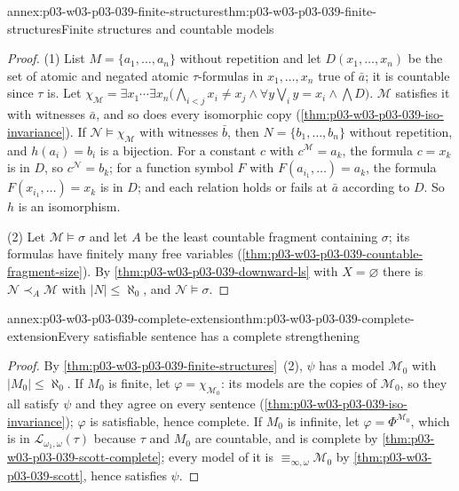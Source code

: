 \begin{annexitem}{annex:p03-w03-p03-039-finite-structures}{thm:p03-w03-p03-039-finite-structures}{Finite structures and countable models}
\begin{proof}
(1) List \(M=\{a_1,\dots,a_n\}\) without repetition and let \(D(x_1,\dots,x_n)\)
be the set of atomic and negated atomic \(\tau\)-formulas in
\(x_1,\dots,x_n\) true of \(\bar a\); it is countable since \(\tau\) is. Let
\(\chi_{\mathcal M}=\exists x_1\cdots\exists x_n\bigl(\bigwedge_{i<j}x_i\ne x_j\wedge\forall y\bigvee_iy=x_i\wedge\bigwedge D\bigr)\).
\(\mathcal M\) satisfies it with witnesses \(\bar a\), and so does every
isomorphic copy (\cref{thm:p03-w03-p03-039-iso-invariance}). If
\(\mathcal N\models\chi_{\mathcal M}\) with witnesses \(\bar b\), then
\(N=\{b_1,\dots,b_n\}\) without repetition, and \(h(a_i)=b_i\) is a
bijection. For a constant \(c\) with \(c^{\mathcal M}=a_k\), the formula
\(c=x_k\) is in \(D\), so \(c^{\mathcal N}=b_k\); for a function symbol
\(F\) with \(F(a_{i_1},\dots)=a_k\), the formula \(F(x_{i_1},\dots)=x_k\) is
in \(D\); and each relation holds or fails at \(\bar a\) according to \(D\).
So \(h\) is an isomorphism.

(2) Let \(\mathcal M\models\sigma\) and let \(A\) be the least countable
fragment containing \(\sigma\); its formulas have finitely many free
variables (\cref{thm:p03-w03-p03-039-countable-fragment-size}). By
\cref{thm:p03-w03-p03-039-downward-ls} with \(X=\varnothing\) there is
\(\mathcal N\prec_A\mathcal M\) with \(\lvert N\rvert\le\aleph_0\), and
\(\mathcal N\models\sigma\).
\end{proof}
\end{annexitem}

\begin{annexitem}{annex:p03-w03-p03-039-complete-extension}{thm:p03-w03-p03-039-complete-extension}{Every satisfiable sentence has a complete strengthening}
\begin{proof}
By \cref{thm:p03-w03-p03-039-finite-structures}~(2), \(\psi\) has a model
\(\mathcal M_0\) with \(\lvert M_0\rvert\le\aleph_0\). If \(M_0\) is finite,
let \(\varphi=\chi_{\mathcal M_0}\): its models are the copies of
\(\mathcal M_0\), so they all satisfy \(\psi\) and they agree on every
sentence (\cref{thm:p03-w03-p03-039-iso-invariance}); \(\varphi\) is
satisfiable, hence complete. If \(M_0\) is infinite, let
\(\varphi=\Phi^{\mathcal M_0}\), which is in \(\mathcal L_{\omega_1,\omega}(\tau)\)
because \(\tau\) and \(M_0\) are countable, and is complete by
\cref{thm:p03-w03-p03-039-scott-complete}; every model of it is
\(\equiv_{\infty,\omega}\mathcal M_0\) by \cref{thm:p03-w03-p03-039-scott},
hence satisfies \(\psi\).
\end{proof}
\end{annexitem}

